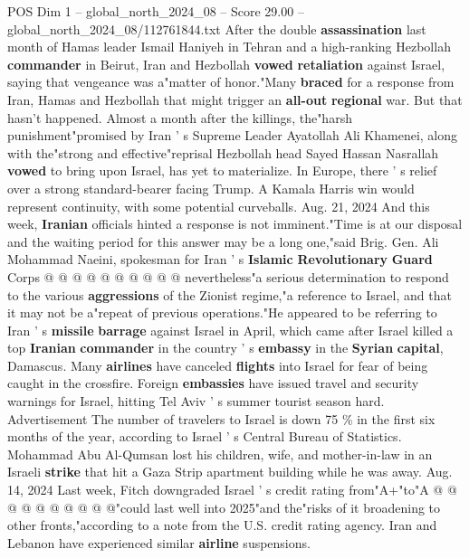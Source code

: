 \begin{textsample}{POS Dim 1 – global\_north\_2024\_08 – Score 29.00 – global\_north\_2024\_08/112761844.txt}  \label{ex:f1_pos_075}
After the double \textbf{assassination} last month of Hamas leader Ismail Haniyeh in Tehran and a high-ranking Hezbollah \textbf{commander} in Beirut, Iran and Hezbollah \textbf{vowed} \textbf{retaliation} against Israel, saying that vengeance was a"matter of honor."Many \textbf{braced} for a response from Iran, Hamas and Hezbollah that might trigger an \textbf{all-out} \textbf{regional} war.
But that hasn't happened.
Almost a month after the killings, the"harsh punishment"promised by Iran ' s Supreme Leader Ayatollah Ali Khamenei, along with the"strong and effective"reprisal Hezbollah head Sayed Hassan Nasrallah \textbf{vowed} to bring upon Israel, has yet to materialize.
In Europe, there ' s relief over a strong standard-bearer facing Trump.
A Kamala Harris win would represent continuity, with some potential curveballs.
Aug. 21, 2024 And this week, \textbf{Iranian} officials hinted a response is not imminent."Time is at our disposal and the waiting period for this answer may be a long one,"said Brig.
Gen.
Ali Mohammad Naeini, spokesman for Iran ' s \textbf{Islamic} \textbf{Revolutionary} \textbf{Guard} Corps @ @ @ @ @ @ @ @ @ @ nevertheless"a serious determination to respond to the various \textbf{aggressions} of the Zionist regime,"a reference to Israel, and that it may not be a"repeat of previous operations."He appeared to be referring to Iran ' s \textbf{missile} \textbf{barrage} against Israel in April, which came after Israel killed a top \textbf{Iranian} \textbf{commander} in the country ' s \textbf{embassy} in the \textbf{Syrian} \textbf{capital}, Damascus.
Many \textbf{airlines} have canceled \textbf{flights} into Israel for fear of being caught in the crossfire.
Foreign \textbf{embassies} have issued travel and security warnings for Israel, hitting Tel Aviv ' s summer tourist season hard.
Advertisement The number of travelers to Israel is down 75 \% in the first six months of the year, according to Israel ' s Central Bureau of Statistics.
Mohammad Abu Al-Qumsan lost his children, wife, and mother-in-law in an Israeli \textbf{strike} that hit a Gaza Strip apartment building while he was away.
Aug. 14, 2024 Last week, Fitch downgraded Israel ' s credit rating from"A+"to"A @ @ @ @ @ @ @ @ @ @"could last well into 2025"and the"risks of it broadening to other fronts,"according to a note from the U.S. credit rating agency.
Iran and Lebanon have experienced similar \textbf{airline} suspensions.

\end{textsample}
